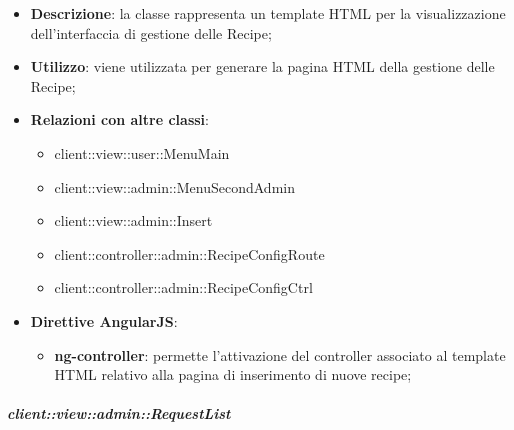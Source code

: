 			\begin{itemize}
				\item \textbf{Descrizione}: la classe rappresenta un template HTML per la visualizzazione dell'interfaccia di gestione delle Recipe;
				\item \textbf{Utilizzo}: viene utilizzata per generare la pagina HTML della gestione delle Recipe;
				\item \textbf{Relazioni con altre classi}:
					\begin{itemize}
						\item client::view::user::MenuMain
						\item client::view::admin::MenuSecondAdmin
						\item client::view::admin::Insert
						\item client::controller::admin::RecipeConfigRoute
						\item client::controller::admin::RecipeConfigCtrl
					\end{itemize}
				\item \textbf{Direttive AngularJS}:
					\begin{itemize}
						\item \textbf{ng-controller}: permette l'attivazione del controller associato al template HTML relativo alla pagina di inserimento di nuove recipe;
					\end{itemize}
			\end{itemize}

		\subparagraph{client::view::admin::RequestList} %
		\label{subp:bdsm_app_client_view_admin_requestlist}

